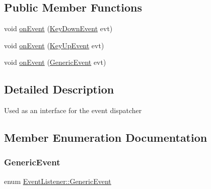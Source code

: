 \subsection*{Public Member Functions}
\begin{DoxyCompactItemize}
\item 
void \hyperlink{class_event_listener_a72427af914eb14753d02338556bfbda8}{on\+Event} (\hyperlink{class_event_listener_ae72c5cb67f8dc880170bf2137837f6ce}{Key\+Down\+Event} evt)
\item 
void \hyperlink{class_event_listener_a7f968abfca56b699a69b10a6c9af5902}{on\+Event} (\hyperlink{class_event_listener_a69daf2aeedcab55e1f2c1c178206789e}{Key\+Up\+Event} evt)
\item 
void \hyperlink{class_event_listener_aa29c811d59b30bf71e00a30d33c7f82c}{on\+Event} (\hyperlink{class_event_listener_a23add62d02511a54eba0bae8208f9f48}{Generic\+Event} evt)
\end{DoxyCompactItemize}


\subsection{Detailed Description}
Used as an interface for the event dispatcher 

\subsection{Member Enumeration Documentation}
\hypertarget{class_event_listener_a23add62d02511a54eba0bae8208f9f48}{}\label{class_event_listener_a23add62d02511a54eba0bae8208f9f48} 
\subsubsection{\texorpdfstring{Generic\+Event}{GenericEvent}}
{\footnotesize\ttfamily enum \hyperlink{class_event_listener_a23add62d02511a54eba0bae8208f9f48}{Event\+Listener\+::\+Generic\+Event}\hspace{0.3cm}{\ttfamily [strong]}}

